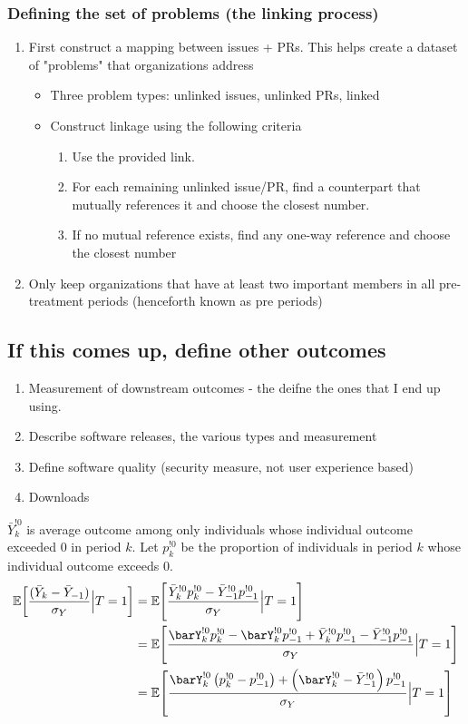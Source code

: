 \documentclass[12pt,notitlepage]{article}
\begin{document}
\subsubsection{Defining the set of problems (the linking process)}
\begin{enumerate}
\item First construct a mapping between issues + PRs. This helps create a dataset of "problems" that organizations address
\begin{itemize}
\item Three problem types: unlinked issues, unlinked PRs, linked
\item Construct linkage using the following criteria
\begin{enumerate}
\item Use the provided link.
\item For each remaining unlinked issue/PR, find a counterpart that mutually references it and choose the closest number.
\item If no mutual reference exists, find any one-way reference and choose the closest number
\end{enumerate}
\end{itemize}
\item Only keep organizations that have at least two important members in all pre-treatment periods (henceforth known as pre periods)
\end{enumerate}
\subsection{If this comes up, define other outcomes}


\begin{enumerate}
\item Measurement of downstream outcomes - the deifne the ones that I end up using. 
\item Describe software releases, the various types and measurement
\item Define software quality (security measure, not user experience based)
\item Downloads
\end{enumerate}

$\bar Y_{k}^{!0} $ is average outcome among only individuals whose individual outcome exceeded 0 in period $k$. Let $p_k^{!0}$ be the proportion of individuals in period $k$ whose individual outcome exceeds 0. 
\begin{align*}
\mathbb{E}\!\left[\frac{(\bar Y_k - \bar Y_{-1}) }{\sigma_Y} \Big| T=1\right] &= \mathbb{E}\!\left[\frac{ \bar Y_{k}^{!0}p_k^{!0} - \bar Y_{-1}^{!0} p_{-1}^{!0} }{\sigma_Y} \Big| T=1\right] \\
&=\mathbb{E}\!\left[\frac{ \barY_{k}^{!0}p_k^{!0} - \barY_{k}^{!0} p_{-1}^{!0} +\bar Y_{k}^{!0}p_{-1}^{!0}-\bar Y_{-1}^{!0}p_{-1}^{!0} }{\sigma_Y} \Big| T=1\right] \\
&=\mathbb{E}\!\left[\frac{ \barY_{k}^{!0} \left(p_k^{!0} -p_{-1}^{!0}\right) +\left( \barY_{k}^{!0}- \bar Y_{-1}^{!0} \right)p_{-1}^{!0}}{\sigma_Y} \Big| T=1\right] 
\end{align*}
\end{document}
